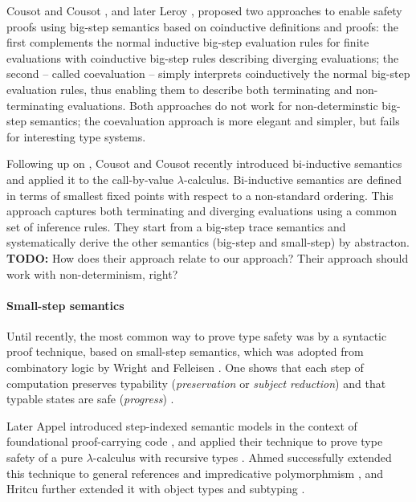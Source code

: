 \documentclass[a4paper,draft,preprint,sort&compress]{elsarticle}
\begin{document}
Cousot and Cousot \cite{CousotCousot92}, and later Leroy \ETAL \cite{LeroyGrall09},
proposed two approaches to enable safety proofs using big-step semantics based on
coinductive definitions and proofs: the first complements the normal inductive big-step
evaluation rules for finite evaluations with coinductive big-step rules describing diverging
evaluations; the second -- called coevaluation -- simply interprets coinductively the normal
big-step evaluation rules, thus enabling them to describe both terminating and non-terminating
evaluations.
Both approaches do not work for non-determinstic big-step semantics; the
coevaluation approach is more elegant and simpler, but fails for interesting type systems.

Following up on \cite{CousotCousot92}, Cousot and Cousot recently introduced bi-inductive
semantics \cite{CousotCousot07} and applied it to the call-by-value $\lambda$-calculus.
Bi-inductive semantics are defined in terms of smallest fixed points with respect to a
non-standard ordering. This approach captures both terminating and diverging evaluations
using a common set of inference rules. They start from a big-step trace semantics and
systematically derive the other semantics (big-step and small-step) by abstracton.
\textbf{TODO:} How does their approach relate to our approach? Their approach should
work with non-determinism, right?


\paragraph{Small-step semantics}

Until recently, the most common way to prove type safety was by a syntactic proof
technique, based on small-step semantics, which was adopted from combinatory
logic by Wright and Felleisen \cite{WrightFelleisen94}. One shows that each step of
computation preserves typability (\emph{preservation} or \emph{subject reduction})
and that typable states are safe (\emph{progress}) \cite{Pierce02}.

Later Appel \ETAL introduced step-indexed semantic models in the context of
foundational proof-carrying code \cite{AppelFelty00}, and applied their technique
to prove type safety of a pure $\lambda$-calculus with recursive types
\cite{AppelMcAllester01}. Ahmed \ETAL successfully extended this technique to
general references and impredicative polymorphmism \cite{AhmedAppelVirga02,Ahmed04},
and Hritcu \ETAL further extended it with object types and subtyping
\cite{Hritcu07,HritcuSchwinghammer09}.
\end{document}
